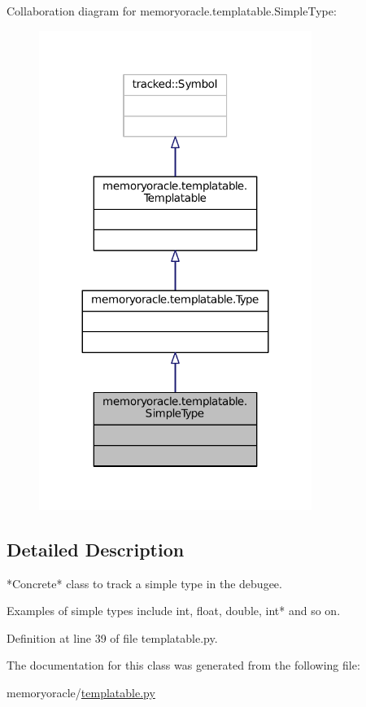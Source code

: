 Collaboration diagram for memoryoracle.\+templatable.\+Simple\+Type\+:\nopagebreak
\begin{figure}[H]
\begin{center}
\leavevmode
\includegraphics[width=251pt]{classmemoryoracle_1_1templatable_1_1SimpleType__coll__graph}
\end{center}
\end{figure}


\subsection{Detailed Description}
\begin{DoxyVerb}*Concrete* class to track a simple type in the debugee.

Examples of simple types include int, float, double, int* and so on.
\end{DoxyVerb}
 

Definition at line 39 of file templatable.\+py.



The documentation for this class was generated from the following file\+:\begin{DoxyCompactItemize}
\item 
memoryoracle/\hyperlink{templatable_8py}{templatable.\+py}\end{DoxyCompactItemize}
